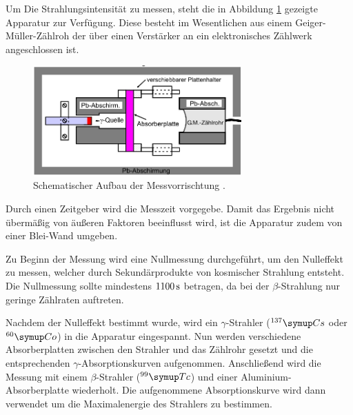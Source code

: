 Um Die Strahlungsintensität zu messen, steht die in Abbildung \ref{aufbau}
gezeigte Apparatur zur Verfügung. Diese besteht im Wesentlichen aus einem
Geiger-Müller-Zählroh der über einen Verstärker an ein elektronisches
Zählwerk angeschlossen ist.
\begin{figure}[H]
  \centering
  \includegraphics[width=8cm]{bilder/app.jpg}
  \caption{Schematischer Aufbau der Messvorrischtung \cite{704}.}
  \label{aufbau}
\end{figure}
\noindent
Durch einen Zeitgeber wird die Messzeit vorgegebe. Damit das Ergebnis nicht
übermäßig von äußeren Faktoren beeinflusst wird, ist die Apparatur zudem von einer
Blei-Wand umgeben.

\noindent
Zu Beginn der Messung wird eine Nullmessung durchgeführt, um den Nulleffekt zu
messen, welcher durch Sekundärprodukte von kosmischer Strahlung entsteht. Die
Nullmessung sollte mindestens $1100\,\si{\second}$ betragen, da bei der $\beta$-Strahlung
nur geringe Zählraten auftreten.

\noindent
Nachdem der Nulleffekt bestimmt wurde, wird ein $\gamma$-Strahler ($^{137}\su{Cs}$
oder $^{60}\su{Co}$) in die Apparatur eingespannt. Nun werden verschiedene
Absorberplatten zwischen den Strahler und das Zählrohr gesetzt und die entsprechenden
$\gamma$-Absorptionskurven aufgenommen.
Anschließend wird die Messung mit einem $\beta$-Strahler ($^{99}\su{Tc}$) und einer
Aluminium-Absorberplatte wiederholt. Die aufgenommene Absorptionskurve wird dann
verwendet um die Maximalenergie des Strahlers zu bestimmen.
